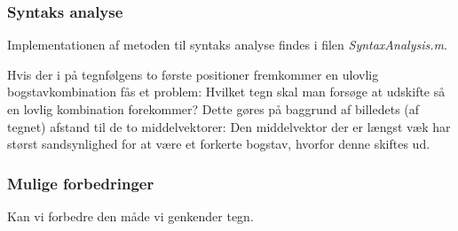 \subsubsection{Syntaks analyse}

Implementationen af metoden til syntaks analyse findes i filen \textit{SyntaxAnalysis.m}.

Hvis der i på tegnfølgens to første positioner fremkommer en ulovlig bogstavkombination fås et problem: Hvilket tegn skal man forsøge at udskifte så en lovlig kombination forekommer? Dette gøres på baggrund af billedets (af tegnet) afstand til de to middelvektorer: Den middelvektor der er længst væk har størst sandsynlighed for at være et forkerte bogstav, hvorfor denne skiftes ud.

\subsubsection{Mulige forbedringer}
Kan vi forbedre den måde vi genkender tegn.